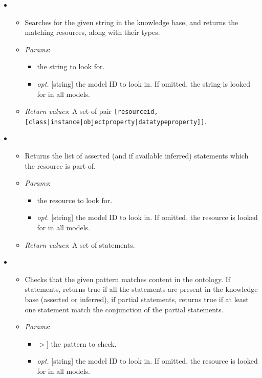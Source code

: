 \begin{itemize}
\item  {}
\begin{itemize}
\item  Searches for the given string in the knowledge base, and returns the matching resources, along with their types.
\item  \emph{Params}:
\begin{itemize}
\item  [string] the string to look for.
\item  \emph{opt.} [string] the model ID to look in. If omitted, the string is looked for in all models. 
\end{itemize}

\item  \emph{Return values}: A set of pair \texttt{[resource{\textunderscore}id, [class|instance|object{\textunderscore}property|datatype{\textunderscore}property]]}.
\end{itemize}

\item  {}
\begin{itemize}
\item  Returns the list of asserted (and if available inferred) statements which the resource is part of.
\item  \emph{Params}:
\begin{itemize}
\item  [string] the resource to look for.
\item  \emph{opt.} [string] the model ID to look in. If omitted, the resource is looked for in all models. 
\end{itemize}

\item  \emph{Return values}: A set of statements.
\end{itemize}

\item  {}
\begin{itemize}
\item  Checks that the given pattern matches content in the ontology. If statements, returns true if all the statements are present in the knowledge base (asserted or inferred), if partial statements, returns true if at least one statement match the conjunction of the partial statements.
\item  \emph{Params}:
\begin{itemize}
\item  [set$<$[statement|partial{\textunderscore}statement]$>$] the pattern to check.
\item  \emph{opt.} [string] the model ID to look in. If omitted, the resource is looked for in all models. 
\end{itemize}


\end{itemize}
\end{itemize}
